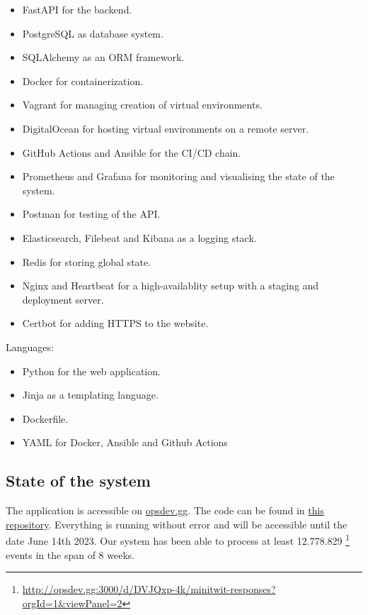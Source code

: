 \documentclass{article}
\begin{document}
\begin{multicols}{2}
\begin{itemize}
    \item FastAPI for the backend.
    \item PostgreSQL as database system.
    \item SQLAlchemy as an ORM framework.
    \item Docker for containerization.
    \item Vagrant for managing creation of virtual environments.
    \item DigitalOcean for hosting virtual environments on a remote server.
    \item GitHub Actions and Ansible for the CI/CD chain.
\end{itemize}
\vfill\null
\columnbreak
\begin{itemize}

    \item Prometheus and Grafana for monitoring and visualising the state of the system.
    \item Postman for testing of the API.
    \item Elasticsearch, Filebeat and Kibana as a logging stack.
    \item Redis for storing global state.
    \item Nginx and Heartbeat for a high-availablity setup with a staging and deployment server.
    \item Certbot for adding HTTPS to the website.
\end{itemize}
\vfill\null
\end{multicols}
Languages:
\begin{itemize}
    \item Python for the web application.
    \item Jinja as a templating language.
    \item Dockerfile.
    \item YAML for Docker, Ansible and Github Actions
\end{itemize}

\subsection{State of the system}

The application is accessible on \url{opsdev.gg}. The code can be found in \href{https://github.com/MinitwitGroupI/MiniTwit}{this repository}. Everything is running without error and will be accessible until the date June 14th 2023.
Our system has been able to process at least 12.778.829 \footnote{\url{http://opsdev.gg:3000/d/DVJQxp-4k/minitwit-responses?orgId=1&viewPanel=2}} events in the span of 8 weeks.
\end{document}
